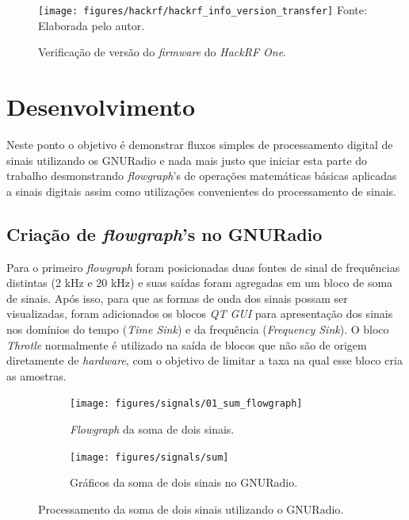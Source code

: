 \documentclass[
  12pt,				%
  openright,			%
  twoside,			%
  a4paper,			%
  english,			%
  french,				%
  spanish,			%
  brazil,				%
  ]{abntex2}
\begin{document}
\begin{figure}[!htb]
  \centering
  \caption{Verificação de versão do \textit{firmware} do \textit{HackRF One}.}
  \texttt{[image: figures/hackrf/hackrf\_info\_version\_transfer]}
  Fonte: Elaborada pelo autor.
  \label{fig:hackrf_info}
\end{figure}
\part{Desenvolvimento}

Neste ponto o objetivo é demonstrar fluxos simples de processamento digital de sinais utilizando os GNURadio e nada mais justo que iniciar esta parte
do trabalho desmonstrando \textit{flowgraph}'s de operações matemáticas básicas aplicadas a sinais digitais assim como utilizações convenientes do processamento de sinais.

\chapter{Criação de \textit{flowgraph}'s no GNURadio}

Para o primeiro \textit{flowgraph} foram posicionadas duas fontes de sinal de frequências distintas (2 kHz e 20 kHz) e suas saídas foram agregadas em um bloco de soma de sinais. Após isso,
para que as formas de onda dos sinais possam ser visualizadas, foram adicionados os blocos \textit{QT GUI} para apresentação dos sinais nos domínios do tempo
(\textit{Time Sink}) e da frequência (\textit{Frequency Sink}). O bloco \textit{Throtle} normalmente é utilizado na saída de blocos que não são de origem
diretamente de \textit{hardware}, com o objetivo de limitar a taxa na qual esse bloco cria as amostras.

\begin{figure}[!htb]
  \centering
  \begin{subfigure}[b]{0.8\linewidth}
    \centering
    \caption{\textit{Flowgraph} da soma de dois sinais.}
    \texttt{[image: figures/signals/01\_sum\_flowgraph]}
    \label{fig:gnuradio_sum_flowgraph}
  \end{subfigure}

  \begin{subfigure}[b]{0.8\linewidth}
    \centering
    \caption{Gráficos da soma de dois sinais no GNURadio.}
    \texttt{[image: figures/signals/sum]}
    \label{fig:gnuradio_sum}
  \end{subfigure}
  \caption{Processamento da soma de dois sinais utilizando o GNURadio.}
  \label{fig:gnuradio_signals_sum}
\end{figure}
\end{document}
